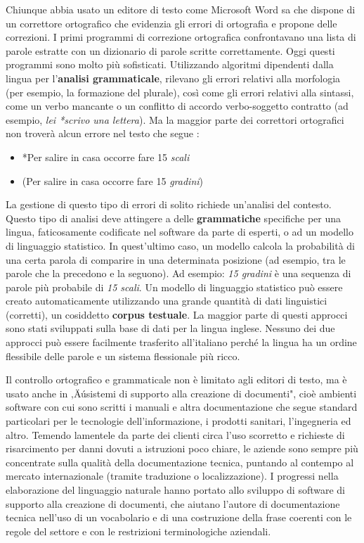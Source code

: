 \begin{multicols}{2}
Chiunque abbia usato un editore di testo come Microsoft Word sa che dispone di un correttore ortografico che evidenzia gli errori di ortografia e propone delle correzioni. I primi programmi di correzione ortografica confrontavano una lista di parole estratte con un dizionario di parole scritte correttamente. Oggi questi programmi sono molto pi\`{u} sofisticati. Utilizzando algoritmi dipendenti dalla lingua per l'\textbf{analisi grammaticale}, rilevano gli errori relativi alla morfologia (per esempio, la formazione del plurale), cos\`{i} come gli errori relativi alla sintassi, come un verbo mancante o un conflitto di accordo verbo-soggetto contratto (ad esempio, \emph{lei *scrivo una lettera}). Ma la maggior parte dei correttori ortografici non trover\`{a} alcun errore nel testo che segue \cite{zar1}:

\begin{itemize}
\item *Per salire in casa occorre fare 15 \emph{scali}
\item (Per salire in casa occorre fare 15 \emph{gradini})
\end{itemize}

La gestione di questo tipo di errori di solito richiede un'analisi del contesto.
Questo tipo di analisi deve attingere a delle \textbf{grammatiche} specifiche per una lingua, faticosamente codificate nel software da parte di esperti, o ad un modello di linguaggio statistico. In quest'ultimo caso, un modello calcola la probabilit\`{a} di una certa parola di comparire in una determinata posizione (ad esempio, tra le parole che la precedono e la seguono). Ad esempio: \emph{15 gradini} \`{e} una sequenza di parole pi\`{u} probabile di \emph{15 scali}. Un modello di linguaggio statistico pu\`{o} essere creato automaticamente utilizzando una grande quantit\`{a} di dati linguistici (corretti), un cosiddetto \textbf{corpus testuale}. La maggior parte di questi approcci sono stati sviluppati sulla base di dati per la lingua inglese. Nessuno dei due approcci pu\`{o} essere facilmente trasferito all'italiano perch\'{e} la lingua ha un ordine flessibile delle parole e un sistema flessionale pi\`{u} ricco.

Il controllo ortografico e grammaticale non \`{e} limitato agli editori di testo, ma \`{e} usato anche in ‚Äúsistemi di supporto alla creazione di documenti", cio\`{e} ambienti software con cui sono scritti i manuali e altra documentazione che segue standard particolari per le tecnologie dell'informazione, i prodotti sanitari, l'ingegneria ed altro. Temendo lamentele da parte dei clienti circa l'uso scorretto e richieste di risarcimento per danni dovuti a istruzioni poco chiare, le aziende sono sempre pi\`{u} concentrate sulla qualit\`{a} della documentazione tecnica, puntando al contempo al mercato internazionale (tramite traduzione o localizzazione). I progressi nella elaborazione del linguaggio naturale hanno portato allo sviluppo di software di supporto alla creazione di documenti, che aiutano l'autore di documentazione tecnica nell'uso di un vocabolario e di una costruzione della frase coerenti con le regole del settore e con le restrizioni terminologiche aziendali.


\end{multicols}
